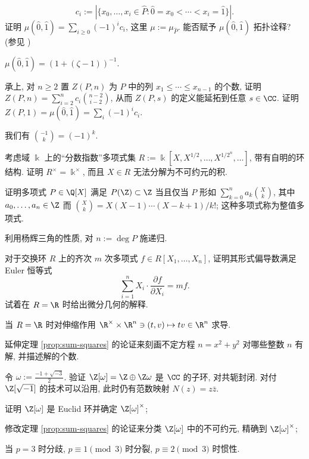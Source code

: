 \begin{Exercises}
		\[ c_i := \left| \{ x_0, \ldots, x_i \in \hat{P} : \hat{0} = x_0 < \cdots < x_i = \hat{1} \} \right|. \]
		证明 $\mu(\hat{0}, \hat{1}) = \sum_{i \geq 0} (-1)^i c_i$, 这里 $\mu := \mu_{\hat{P}}$. 能否赋予 $\mu(\hat{0}, \hat{1})$ 拓扑诠释? (参见 \cite[\S 3.8]{Stan09})
		\begin{hint}
			$\mu(\hat{0}, \hat{1}) = (1 + (\zeta - 1))^{-1}$.
		\end{hint}
	\item 承上, 对 $n \geq 2$ 置 $Z(P,n)$ 为 $P$ 中的列 $x_1 \leq \cdots \leq x_{n-1}$ 的个数, 证明 $Z(P,n) = \sum_{i=2}^n c_i \binom{n-2}{i-2}$, 从而 $Z(P,s)$ 的定义能延拓到任意 $s \in \CC$. 证明 $Z(P,1) = \mu(\hat{0},\hat{1}) = \sum_i (-1)^i c_i$. \begin{hint} 我们有 $\binom{-1}{k} = (-1)^k$. \end{hint}
	\item 考虑域 $\Bbbk$ 上的``分数指数''多项式集 $R := \Bbbk[X, X^{1/2}, \ldots, X^{1/2^n}, \ldots]$, 带有自明的环结构. 证明 $R^\times = \Bbbk^\times$, 而且 $X \in R$ 无法分解为不可约元的积.
	\item 证明多项式 $P \in \Q[X]$ 满足 $P(\Z) \subset \Z$ 当且仅当 $P$ 形如 $\sum_{k=0}^n a_k \binom{X}{k}$, 其中 $a_0, \ldots, a_n \in \Z$ 而 $\binom{X}{k} = X(X-1) \cdots (X-k+1)/k!$; 这种多项式称为整值多项式. \begin{hint} 利用杨辉三角的性质, 对 $n := \deg P$ 施递归. \end{hint}
	\item 对于交换环 $R$ 上的齐次 $m$ 次多项式 $f \in R[X_1, \ldots, X_n]$, 证明其形式偏导数满足 Euler 恒等式
		\[ \sum_{i=1}^n X_i \cdot \frac{\partial f}{\partial X_i} = m f. \]
		试着在 $R=\R$ 时给出微分几何的解释. \begin{hint} 当 $R=\R$ 时对伸缩作用 $\R^\times \times \R^n \ni (t,v) \mapsto tv \in \R^n$ 求导. \end{hint}
	\item 延伸定理 \ref{prop:sum-squares} 的论证来刻画不定方程 $n = x^2 + y^2$ 对哪些整数 $n$ 有解, 并描述解的个数.
	\item 令 $\omega := \frac{-1 + \sqrt{-3}}{2}$. 验证 $\Z[\omega] = \Z \oplus \Z\omega$ 是 $\CC$ 的子环, 对共轭封闭. 对付 $\Z[\sqrt{-1}]$ 的技术可以沿用, 此时仍有范数映射 $N(z) = z\bar{z}$.
		\begin{compactenum}[(i)]
			\item 证明 $\Z[\omega]$ 是 Euclid 环并确定 $\Z[\omega]^\times$;
			\item 修改定理 \ref{prop:sum-squares} 的论证来分类 $\Z[\omega]$ 中的不可约元, 精确到 $\Z[\omega]^\times$; \begin{hint} 当 $p=3$ 时分歧, $p \equiv 1 \pmod 3$ 时分裂, $p \equiv 2 \pmod 3$ 时惯性. \end{hint}

\end{compactenum}
\end{Exercises}
